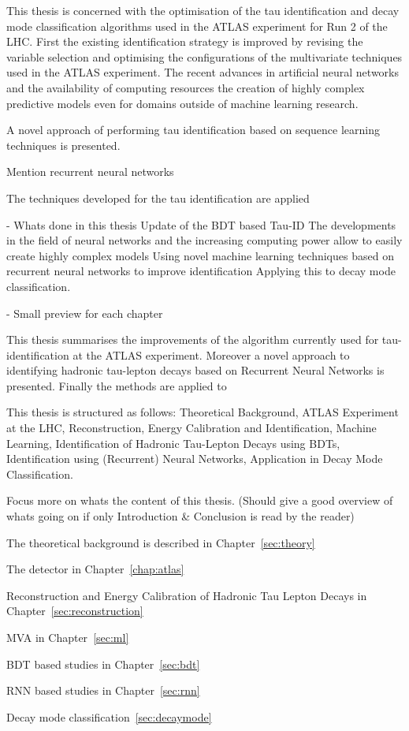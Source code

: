 This thesis is concerned with the optimisation of the tau identification and
decay mode classification algorithms used in the ATLAS experiment for Run 2 of
the LHC. First the existing identification strategy is improved by revising the
variable selection and optimising the configurations of the multivariate
techniques used in the ATLAS experiment. The recent advances in artificial
neural networks and the availability of computing resources  the creation
of highly complex predictive models even for domains outside of machine learning
research.


A novel approach of performing tau identification based on sequence learning
techniques is presented.

Mention recurrent neural networks

The techniques developed for the tau identification are applied


- Whats done in this thesis Update of the BDT based Tau-ID The developments in
the field of neural networks and the increasing computing power allow to easily
create highly complex models Using novel machine learning techniques based on
recurrent neural networks to improve identification Applying this to decay mode
classification.


- Small preview for each chapter

This thesis summarises the improvements of the algorithm currently used for
tau-identification at the ATLAS experiment. Moreover a novel approach to
identifying hadronic tau-lepton decays based on Recurrent Neural Networks is
presented. Finally the methods are applied to

This thesis is structured as follows: Theoretical Background, ATLAS Experiment
at the LHC, Reconstruction, Energy Calibration and Identification, Machine
Learning, Identification of Hadronic Tau-Lepton Decays using BDTs,
Identification using (Recurrent) Neural Networks, Application in Decay Mode
Classification.

Focus more on whats the content of this thesis. (Should give a good overview of
whats going on if only Introduction \& Conclusion is read by the reader)


The theoretical background is described in Chapter~\ref{sec:theory}

The detector in Chapter~\ref{chap:atlas}

Reconstruction and Energy Calibration of Hadronic Tau Lepton Decays in
Chapter~\ref{sec:reconstruction}

MVA in Chapter~\ref{sec:ml}

BDT based studies in Chapter~\ref{sec:bdt}

RNN based studies in Chapter~\ref{sec:rnn}

Decay mode classification~\ref{sec:decaymode}



